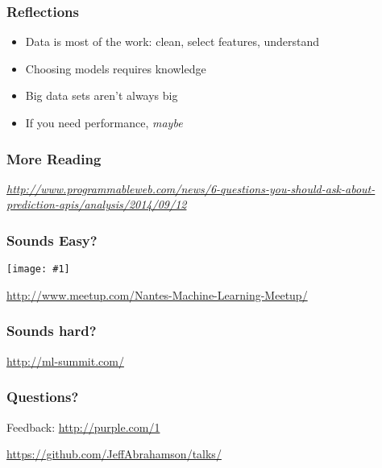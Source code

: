 \documentclass{beamer}
\newcommand\smallgray[1]{\textcolor{gray}{\footnotesize\it #1}}
\newcommand\prevwork[1]{\smallgray{#1}}
\newcommand\solo[1]{\centerline{#1}}
\newcommand\cimg[1]{\centerline{\texttt{[image: \#1]}}}
\newcommand\cimgsm[1]{\centerline{\texttt{[image: \#1]}}}
\begin{document}


\begin{frame}
  \frametitle{Reflections}

  \begin{itemize}
  \item Data is most of the work: clean, select features, understand
  \item Choosing models requires knowledge
  \item Big data sets aren't always big
  \item If you need performance, \textit{maybe}
  \end{itemize}

\end{frame}

\begin{frame}
  \frametitle{More Reading}

  \prevwork{\url{http://www.programmableweb.com/news/6-questions-you-should-ask-about-prediction-apis/analysis/2014/09/12}}
  
\end{frame}

\begin{frame}[t]
  \frametitle{Sounds Easy?}

  \vspace{1cm}
  \cimg{nmlm.png}

  \prevwork{\centerline{\url{http://www.meetup.com/Nantes-Machine-Learning-Meetup/}}}

\end{frame}

\begin{frame}
  \frametitle{Sounds hard?}


  \prevwork{\centerline{\url{http://ml-summit.com/}}}
\end{frame}

\begin{frame}
  \frametitle{Questions?}

  \centerline{Feedback: \url{http://purple.com/1}}
  \vspace{1cm}
  \centerline{\url{https://github.com/JeffAbrahamson/talks/}}
\end{frame}
\end{document}
